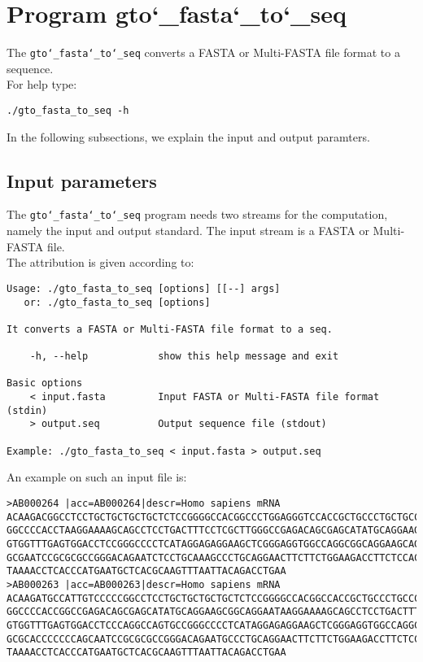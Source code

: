 \section{Program gto\char`_fasta\char`_to\char`_seq}
The \texttt{gto\char`_fasta\char`_to\char`_seq} converts a FASTA or Multi-FASTA file format to a sequence.\\
For help type:
\begin{lstlisting}
./gto_fasta_to_seq -h
\end{lstlisting}
In the following subsections, we explain the input and output paramters.

\subsection*{Input parameters}

The \texttt{gto\char`_fasta\char`_to\char`_seq} program needs two streams for the computation, namely the input and output standard. The input stream is a FASTA or Multi-FASTA file.\\
The attribution is given according to:
\begin{lstlisting}
Usage: ./gto_fasta_to_seq [options] [[--] args]
   or: ./gto_fasta_to_seq [options]

It converts a FASTA or Multi-FASTA file format to a seq.

    -h, --help            show this help message and exit

Basic options
    < input.fasta         Input FASTA or Multi-FASTA file format (stdin)
    > output.seq          Output sequence file (stdout)

Example: ./gto_fasta_to_seq < input.fasta > output.seq
\end{lstlisting}
An example on such an input file is:
\begin{lstlisting}
>AB000264 |acc=AB000264|descr=Homo sapiens mRNA 
ACAAGACGGCCTCCTGCTGCTGCTGCTCTCCGGGGCCACGGCCCTGGAGGGTCCACCGCTGCCCTGCTGCCATTGTCCCC
GGCCCCACCTAAGGAAAAGCAGCCTCCTGACTTTCCTCGCTTGGGCCGAGACAGCGAGCATATGCAGGAAGCGGCAGGAA
GTGGTTTGAGTGGACCTCCGGGCCCCTCATAGGAGAGGAAGCTCGGGAGGTGGCCAGGCGGCAGGAAGCAGGCCAGTGCC
GCGAATCCGCGCGCCGGGACAGAATCTCCTGCAAAGCCCTGCAGGAACTTCTTCTGGAAGACCTTCTCCACCCCCCCAGC
TAAAACCTCACCCATGAATGCTCACGCAAGTTTAATTACAGACCTGAA
>AB000263 |acc=AB000263|descr=Homo sapiens mRNA 
ACAAGATGCCATTGTCCCCCGGCCTCCTGCTGCTGCTGCTCTCCGGGGCCACGGCCACCGCTGCCCTGCCCCTGGAGGGT
GGCCCCACCGGCCGAGACAGCGAGCATATGCAGGAAGCGGCAGGAATAAGGAAAAGCAGCCTCCTGACTTTCCTCGCTTG
GTGGTTTGAGTGGACCTCCCAGGCCAGTGCCGGGCCCCTCATAGGAGAGGAAGCTCGGGAGGTGGCCAGGCGGCAGGAAG
GCGCACCCCCCCAGCAATCCGCGCGCCGGGACAGAATGCCCTGCAGGAACTTCTTCTGGAAGACCTTCTCCTCCTGCAAA
TAAAACCTCACCCATGAATGCTCACGCAAGTTTAATTACAGACCTGAA
\end{lstlisting}

